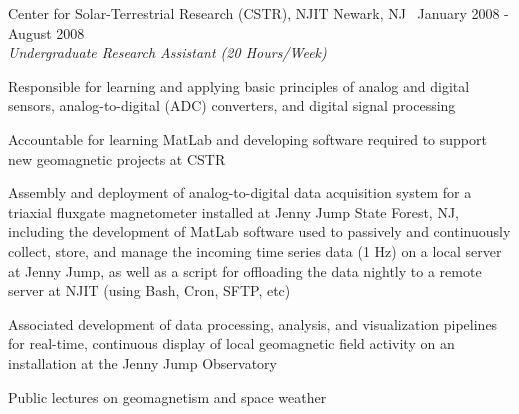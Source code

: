 \leftandright
  {Center for Solar-Terrestrial Research (CSTR), NJIT}
  {Newark, NJ \textbullet\, January 2008 - August 2008}\\  
\vspace{-0.8em}
\textit{Undergraduate Research Assistant (20 Hours/Week)}
\begin{itemize*}
  \item Responsible for learning and applying basic principles
    of analog and digital sensors, analog-to-digital (ADC) converters,
    and digital signal processing
  \item Accountable for learning MatLab and developing software
    required to support new geomagnetic projects at CSTR
  \item Assembly and deployment of analog-to-digital data acquisition system
    for a triaxial fluxgate magnetometer installed at Jenny Jump State
    Forest, NJ, including the development of MatLab software used to
    passively and continuously collect, store, and manage the 
    incoming time series data (1 Hz) on a local server at Jenny Jump,
    as well as a script for offloading the data nightly
    to a remote server at NJIT (using Bash, Cron, SFTP, etc)
  \item Associated development of data processing, analysis, and
    visualization pipelines for real-time, continuous 
    display of local geomagnetic field activity on an installation
    at the Jenny Jump Observatory
  \item Public lectures on geomagnetism and space weather 
\end{itemize*}


